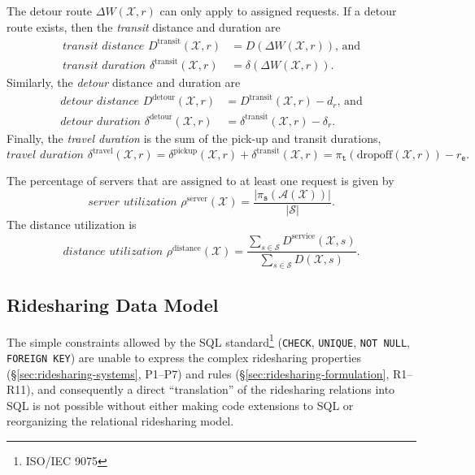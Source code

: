 \documentclass{article}
\newcommand{\hi}[1]{\noindent {\bf #1}}
\theoremstyle{definition}
\begin{document}
The detour route $\Delta W(\mathcal{X},r)$ can only apply to assigned requests. If
a detour route exists, then
the \emph{transit} distance and duration are
\begin{align}
\label{eq:transit-distance}
\textit{transit distance }D^\textrm{transit}(\mathcal{X},r)&=D(\Delta W(\mathcal{X},r))\textrm{, and}\\
\label{eq:transit-duration}
\textit{transit duration }\delta^\textrm{transit}(\mathcal{X},r)&=\delta(\Delta W(\mathcal{X},r)).
\end{align}
Similarly, the \emph{detour} distance and duration are
\begin{align}
\label{eq:detour-distance}
\textit{detour distance }D^\textrm{detour}(\mathcal{X},r)&=D^\textrm{transit}(\mathcal{X},r)-d_r\textrm{, and}\\
\label{eq:detour-duration}
\textit{detour duration }\delta^\textrm{detour}(\mathcal{X},r)&=\delta^\textrm{transit}(\mathcal{X},r)-\delta_r.
\end{align}
Finally, the \emph{travel duration} is the sum of the pick-up and transit durations,
\begin{equation}
\label{eq:travel-duration}
\textit{travel duration }\delta^\textrm{travel}(\mathcal{X},r)=\delta^\textrm{pickup}(\mathcal{X},r)+\delta^\textrm{transit}(\mathcal{X},r)
=\pi_\texttt{t}(\textrm{dropoff}(\mathcal{X},r))-r_\texttt{e}.
\end{equation}

\hi{Utilization.}
The percentage of servers that are assigned to at least one request is given by
\begin{equation}
\label{eq:server-utilization}
\textit{server utilization }\rho^\textrm{server}(\mathcal{X})=\frac{|\pi_\texttt{s}(\mathcal{A}(\mathcal{X}))|}{|\mathcal{S}|}.
\end{equation}
The distance utilization is
\begin{equation}
\label{eq:distance-utilization}
\textit{distance utilization }\rho^\textrm{distance}(\mathcal{X})=
\frac{\sum_{s\in\mathcal{S}}D^\textrm{service}(\mathcal{X},s)}
{\sum_{s\in\mathcal{S}}D(\mathcal{X},s)}.
\end{equation}

\subsection{Ridesharing Data Model}
\label{sec:ridesharing-data-model}
The simple constraints allowed by the SQL standard\footnote{ISO/IEC 9075}
(\texttt{CHECK}, \texttt{UNIQUE}, \texttt{NOT NULL}, \texttt{FOREIGN KEY}) are
unable to express the complex ridesharing properties
(\S\ref{sec:ridesharing-systems}, P1--P7) and rules
(\S\ref{sec:ridesharing-formulation}, R1--R11), and consequently a direct
``translation'' of the ridesharing relations into SQL is not possible without
either making code extensions to SQL or reorganizing the relational ridesharing
model.
\end{document}

